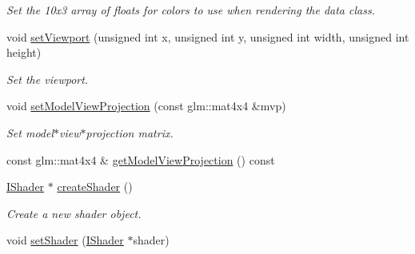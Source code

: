 \begin{DoxyCompactItemize}
\begin{DoxyCompactList}\small\item\em Set the 10x3 array of floats for colors to use when rendering the data class. \end{DoxyCompactList}\item 
void \hyperlink{class_lots_of_lines_1_1_open_g_l_renderer_ae0fc80e7572adfa6c830fbe58f1c1f5e}{set\+Viewport} (unsigned int x, unsigned int y, unsigned int width, unsigned int height)\hypertarget{class_lots_of_lines_1_1_open_g_l_renderer_ae0fc80e7572adfa6c830fbe58f1c1f5e}{}\label{class_lots_of_lines_1_1_open_g_l_renderer_ae0fc80e7572adfa6c830fbe58f1c1f5e}

\begin{DoxyCompactList}\small\item\em Set the viewport. \end{DoxyCompactList}\item 
void \hyperlink{class_lots_of_lines_1_1_open_g_l_renderer_afb420692fd26c88fafe39c85f29e030f}{set\+Model\+View\+Projection} (const glm\+::mat4x4 \&mvp)\hypertarget{class_lots_of_lines_1_1_open_g_l_renderer_afb420692fd26c88fafe39c85f29e030f}{}\label{class_lots_of_lines_1_1_open_g_l_renderer_afb420692fd26c88fafe39c85f29e030f}

\begin{DoxyCompactList}\small\item\em Set model$\ast$view$\ast$projection matrix. \end{DoxyCompactList}\item 
const glm\+::mat4x4 \& \hyperlink{class_lots_of_lines_1_1_open_g_l_renderer_a003e562c0f86b870e4fcc1f5ed0cabf0}{get\+Model\+View\+Projection} () const 
\item 
\hyperlink{class_lots_of_lines_1_1_i_shader}{I\+Shader} $\ast$ \hyperlink{class_lots_of_lines_1_1_open_g_l_renderer_afefdab5ffbe8ad3af4736ae4432f9f65}{create\+Shader} ()\hypertarget{class_lots_of_lines_1_1_open_g_l_renderer_afefdab5ffbe8ad3af4736ae4432f9f65}{}\label{class_lots_of_lines_1_1_open_g_l_renderer_afefdab5ffbe8ad3af4736ae4432f9f65}

\begin{DoxyCompactList}\small\item\em Create a new shader object. \end{DoxyCompactList}\item 
void \hyperlink{class_lots_of_lines_1_1_open_g_l_renderer_a1d11632acd909487114454857454e0c2}{set\+Shader} (\hyperlink{class_lots_of_lines_1_1_i_shader}{I\+Shader} $\ast$shader)\hypertarget{class_lots_of_lines_1_1_open_g_l_renderer_a1d11632acd909487114454857454e0c2}{}\label{class_lots_of_lines_1_1_open_g_l_renderer_a1d11632acd909487114454857454e0c2}


\end{DoxyCompactItemize}
